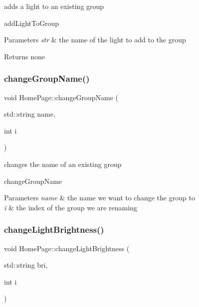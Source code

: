 adds a light to an existing group 

add\+Light\+To\+Group 
\begin{DoxyParams}{Parameters}
{\em str} & the name of the light to add to the group \\
\hline
\end{DoxyParams}
\begin{DoxyReturn}{Returns}
none 
\end{DoxyReturn}
\mbox{\label{class_home_page_a515f5cac6f72edd5303f2e1131216640}} 
\subsubsection{\texorpdfstring{change\+Group\+Name()}{changeGroupName()}}
{\footnotesize\ttfamily void Home\+Page\+::change\+Group\+Name (\begin{DoxyParamCaption}\item[{std\+::string}]{name,  }\item[{int}]{i }\end{DoxyParamCaption})}



changes the name of an existing group 

change\+Group\+Name 
\begin{DoxyParams}{Parameters}
{\em name} & the name we want to change the group to \\
\hline
{\em i} & the index of the group we are renaming \\
\hline
\end{DoxyParams}
\mbox{\label{class_home_page_a748389a4b1b13e026e6d269c4df1f8d5}} 
\subsubsection{\texorpdfstring{change\+Light\+Brightness()}{changeLightBrightness()}}
{\footnotesize\ttfamily void Home\+Page\+::change\+Light\+Brightness (\begin{DoxyParamCaption}\item[{std\+::string}]{bri,  }\item[{int}]{i }\end{DoxyParamCaption})}



